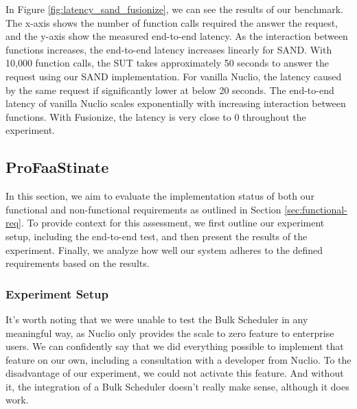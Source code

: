 In Figure \ref{fig:latency_sand_fusionize}, we can see the results of our
benchmark. The x-axis shows the number of function calls required the answer the
request, and the y-axis show the measured end-to-end latency. As the interaction
between functions increases, the end-to-end latency increases linearly for SAND.
With 10,000 function calls, the SUT takes approximately 50 seconds to answer the
request using our SAND implementation. For vanilla Nuclio, the latency caused by
the same request if significantly lower at below 20 seconds. The end-to-end
latency of vanilla Nuclio scales exponentially with increasing interaction
between functions. With Fusionize, the latency is very close to 0 throughout the
experiment.


\subsection{ProFaaStinate}
\label{sec:eval-profaastinate}
In this section, we aim to evaluate the implementation status of both our functional and non-functional requirements as outlined in Section \ref{sec:functional-req}. To provide context for this assessment, we first outline our experiment setup, including the end-to-end test, and then present the results of the experiment. Finally, we analyze how well our system adheres to the defined requirements based on the results.

\subsubsection{Experiment Setup}

It's worth noting that we were unable to test the Bulk Scheduler in any meaningful way, as Nuclio only provides the scale to zero feature to enterprise users. We can confidently say that we did everything possible to implement that feature on our own, including a consultation with a developer from Nuclio. To the disadvantage of our experiment, we could not activate this feature. And without it, the integration of a Bulk Scheduler doesn't really make sense, although it does work.

